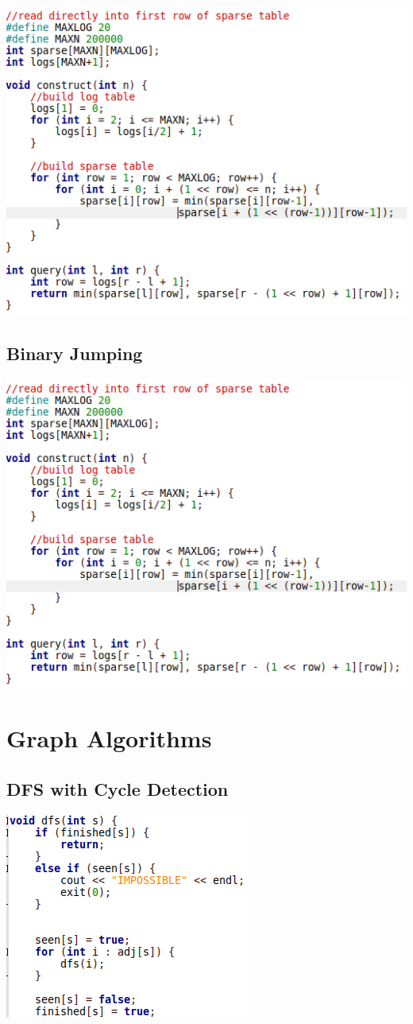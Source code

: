 \documentclass[11pt,twocolumn]{article}
\begin{document}
\includegraphics[scale=0.4]{sparsemin}

\subsection{Binary Jumping}

\includegraphics[scale=0.4]{sparsemin}

\section{Graph Algorithms}
\subsection{DFS with Cycle Detection}
\includegraphics[scale=0.5]{dfs}
\end{document}

